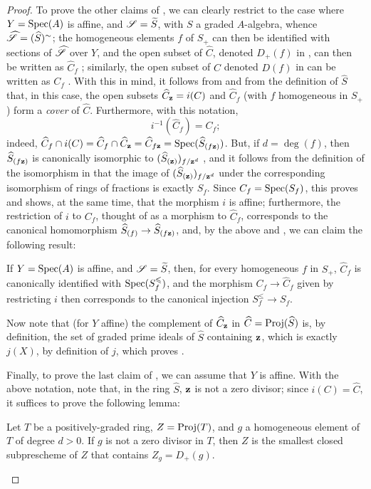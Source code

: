 \begin{proof}
To prove the other claims of , we can clearly restrict to the case where $Y=\operatorname{Spec}(A)$ is affine, and $\mathscr{S}=\widetilde{S}$, with $S$ a graded $A$-algebra, whence $\widehat{\mathscr{S}}=(\widehat{S})^\sim$;
the homogeneous elements $f$ of $S_+$ can then be identified with sections of $\widehat{\mathscr{S}}$ over $Y$, and the open subset of $\widehat{C}$, denoted $D_+(f)$ in , can then be written as $\widehat{C}_f$ ;
similarly, the open subset of $C$ denoted $D(f)$ in  can be written as $C_f$ .
With this in mind, it follows from  and from the definition of $\widehat{S}$ that, in this case, the open subsets $\widehat{C}_{\mathbf{z}}=i(C)$ and $\widehat{C}_f$ (with $f$ homogeneous in $S_+$) form a \emph{cover} of $\widehat{C}$.
Furthermore, with this notation,
\[
\label{eq:2.8.3.2.5}
  i^{-1}(\widehat{C}_f) = C_f;
\tag{8.3.2.5}
\]
indeed, $\widehat{C}_f\cap i(C) = \widehat{C}_f\cap\widehat{C}_{\mathbf{z}} = \widehat{C}_{f\mathbf{z}} = \operatorname{Spec}(\widehat{S}_{(f\mathbf{z})})$.
But, if $d=\deg(f)$, then $\widehat{S}_{(f\mathbf{z})}$ is canonically isomorphic to $(\widehat{S}_{(\mathbf{z})})_{f/\mathbf{z}^d}$ , and it follows from the definition of the isomorphism in  that the image of $(\widehat{S}_{(\mathbf{z})})_{f/\mathbf{z}^d}$ under the corresponding isomorphism of rings of fractions is exactly $S_f$.
Since $C_f=\operatorname{Spec}(S_f)$, this proves  and shows, at the same time, that the morphism $i$ is affine;
furthermore, the restriction of $i$ to $C_f$, thought of as a morphism to $\widehat{C}_f$, corresponds  to the canonical homomorphism $\widehat{S}_{(f)}\to\widehat{S}_{(f\bb{z})}$, and, by the above and , we can claim the following result:
\begin{env}[8.3.2.6]
\label{2.8.3.2.6}
If $Y=\operatorname{Spec}(A)$ is affine, and $\mathscr{S}=\widetilde{S}$, then, for every homogeneous $f$ in $S_+$, $\widehat{C}_f$ is canonically identified with $\operatorname{Spec}(S_f^\leqslant)$, and the morphism $C_f\to\widehat{C}_f$ given by restricting $i$ then corresponds to the canonical injection $S_f^\leq\to S_f$.
\end{env}

Now note that (for $Y$ affine) the complement of $\widehat{C}_{\mathbf{z}}$ in $\widehat{C}=\operatorname{Proj}(\widehat{S})$
is, by definition, the set of graded prime ideals of $\widehat{S}$ containing $\mathbf{z}$, which is exactly $j(X)$, by definition of $j$, which proves .

Finally, to prove the last claim of , we can assume that $Y$ is affine.
With the above notation, note that, in the ring $\widehat{S}$, $\mathbf{z}$ is not a zero divisor;
since $i(C)=\widehat{C}$, it suffices to prove the following lemma:
\begin{lemma}[8.3.2.7]
\label{2.8.3.2.7}
Let $T$ be a positively-graded ring, $Z=\operatorname{Proj}(T)$, and $g$ a homogeneous element of $T$ of degree $d>0$.
If $g$ is not a zero divisor in $T$, then $Z$ is the smallest closed subprescheme of $Z$ that contains $Z_g=D_+(g)$.
\end{lemma}


\end{proof}
